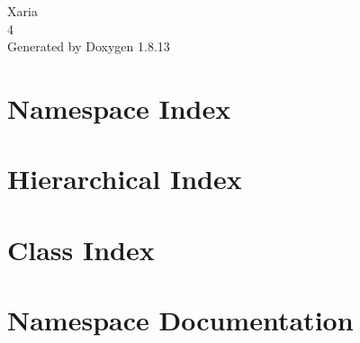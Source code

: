 \documentclass[twoside]{book}
\newcommand{\+}{\discretionary{\mbox{\scriptsize$\hookleftarrow$}}{}{}}
\newcommand{\clearemptydoublepage}{%
  \newpage{\pagestyle{empty}\cleardoublepage}%
}
\begin{document}
\hypersetup{pageanchor=false,
             bookmarksnumbered=true,
             pdfencoding=unicode
            }
\begin{titlepage}
\vspace*{7cm}
\begin{center}%
{\Large Xaria \\[1ex]\large 4 }\\
\vspace*{1cm}
{\large Generated by Doxygen 1.8.13}\\
\end{center}
\end{titlepage}
\clearemptydoublepage
{}
\tableofcontents
\clearemptydoublepage
{}
\hypersetup{pageanchor=true}

\chapter{Namespace Index}

\chapter{Hierarchical Index}

\chapter{Class Index}

\chapter{Namespace Documentation}





\end{document}
